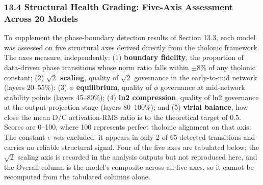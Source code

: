 \documentclass[
  11pt,
  letterpaper,
]{article}
\begin{document}
\subsubsection{13.4 Structural Health Grading: Five-Axis Assessment
Across 20
Models}\label{structural-health-grading-five-axis-assessment-across-20-models}

To supplement the phase-boundary detection results of Section 13.3, each
model was assessed on five structural axes derived directly from the
tholonic framework. The axes measure, independently: (1)
\textbf{boundary fidelity}, the proportion of data-driven phase
transitions whose norm ratio falls within \(\pm 8\%\) of any tholonic
constant; (2) \textbf{\(\sqrt{2}\) scaling}, quality of \(\sqrt{2}\)
governance in the early-to-mid network (layers 20--55\%); (3)
\textbf{\(\phi\) equilibrium}, quality of \(\phi\) governance at
mid-network stability points (layers 45--80\%); (4) \textbf{ln2
compression}, quality of ln2 governance at the output-projection stage
(layers 80--100\%); and (5) \textbf{virial balance}, how close the mean
D/C activation-RMS ratio is to the theoretical target of 0.5. Scores are
0--100, where 100 represents perfect tholonic alignment on that axis.
The constant \(e\) was excluded: it appears in only 2 of 65 detected
transitions and carries no reliable structural signal. Four of the five
axes are tabulated below; the \(\sqrt{2}\) scaling axis is recorded in
the analysis outputs but not reproduced here, and the Overall column is
the model's composite across all five axes, so it cannot be recomputed
from the tabulated columns alone.
\end{document}
